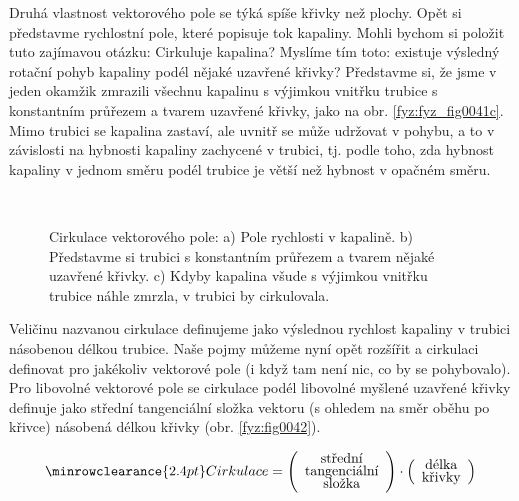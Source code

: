     Druhá vlastnost vektorového pole se týká spíše křivky než plochy. Opět si představme rychlostní 
    pole, které popisuje tok kapaliny. Mohli bychom si položit tuto zajímavou otázku: Cirkuluje 
    kapalina? Myslíme tím toto: existuje výsledný rotační pohyb kapaliny podél nějaké uzavřené 
    křivky? Představme si, že jsme v jeden okamžik zmrazili všechnu kapalinu s výjimkou vnitřku 
    trubice s konstantním průřezem a tvarem uzavřené křivky, jako na obr. \ref{fyz:fyz_fig0041c}. 
    Mimo trubici se kapalina zastaví, ale uvnitř se může udržovat v pohybu, a to v závislosti na 
    hybnosti kapaliny zachycené v trubici, tj. podle toho, zda hybnost kapaliny v jednom směru 
    podél trubice je větší než hybnost v opačném směru.  

    \begin{figure}[ht!]
      \centering
        \\
      \caption{Cirkulace vektorového pole: a) Pole rychlosti v kapalině. b) Představme si trubici s
               konstantním průřezem a tvarem nějaké uzavřené křivky. c) Kdyby kapalina všude s
               výjimkou vnitřku trubice náhle zmrzla, v trubici by cirkulovala.
               \cite[s.~18]{Feynman02}}
      \label{fyz:fig0041}
    \end{figure}    

    Veličinu nazvanou cirkulace definujeme jako výslednou rychlost kapaliny v trubici násobenou 
    délkou trubice. Naše pojmy můžeme nyní opět rozšířit a cirkulaci definovat pro jakékoliv 
    vektorové pole (i když tam není nic, co by se pohybovalo). Pro libovolné vektorové pole se 
    cirkulace podél libovolné myšlené uzavřené křivky definuje jako střední tangenciální složka 
    vektoru (s ohledem na směr oběhu po křivce) násobená délkou křivky (obr. \ref{fyz:fig0042}). 

    
    \begin{equation}\label{fyz:eq_fey_elmag05}
      \renewcommand\arraystretch{0.6} \setlength\minrowclearance{2.4pt}
      \text{Cirkulace} = 
        \left(\begin{array}{c}
          \text{střední}      \\
          \text{tangenciální} \\
          \text{složka}
         \end{array}
       \right)\cdot
       \left(\begin{array}{c}
          \text{délka}      \\
          \text{křivky}
        \end{array}
       \right)
    \end{equation}

